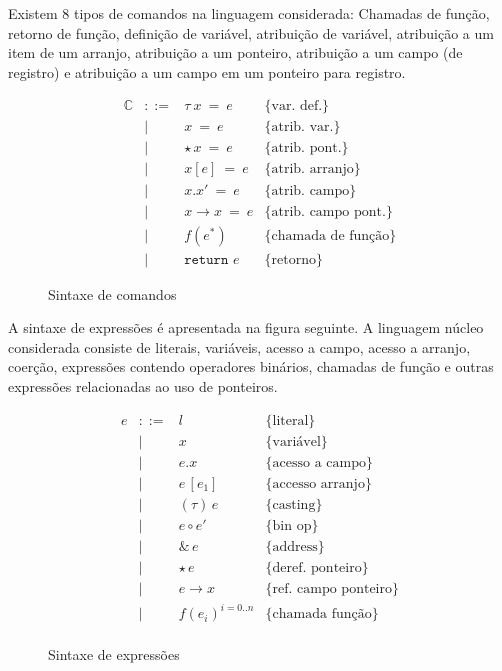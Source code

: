 \documentclass[a4paper,8pt]{article}
\begin{document}
     Existem 8 tipos de comandos na linguagem considerada: Chamadas de
     função, retorno de função, definição de variável, atribuição de
     variável, atribuição a um item de um arranjo, atribuição a um
     ponteiro, atribuição a um campo (de registro) e atribuição a um
     campo em um ponteiro para registro.

     \begin{figure}[h]
       \[
         \begin{array}{lcll}
           \mathbb{C} & ::=   & \tau\:x\:=\:e & \{\text{var. def.}\} \\
             & \mid & x\:=\:e & \{\text{atrib. var.}\} \\
             & \mid & \star\,x\:=\:e & \{\text{atrib. pont.}\} \\
             & \mid & x[e]\:=\:e &\{\text{atrib. arranjo}\} \\
             & \mid & x.x'\: = \: e & \{\text{atrib. campo}\} \\
             & \mid & x\to x\: = \: e & \{\text{atrib. campo pont.}\}\\
             & \mid & f(e^*) & \{\text{chamada de função}\} \\
             & \mid & \texttt{return }e & \{\text{retorno}\}
         \end{array} \]
       \centering
       \caption{Sintaxe de comandos}
       \label{figcmdsyn}
    \end{figure}

    A sintaxe de expressões é apresentada na figura seguinte. A
    linguagem núcleo considerada consiste de literais, variáveis,
    acesso a campo, acesso a arranjo, coerção, expressões contendo
    operadores binários, chamadas de função e outras expressões
    relacionadas ao uso de ponteiros.

    \begin{figure}[h]
       \[
         \begin{array}{lcll}
           e & ::= & l & \{\text{literal}\} \\
             & \mid & x & \{\text{variável}\} \\
             & \mid & e . x & \{\text{acesso a campo}\}\\
             & \mid & e\,[e_1] & \{\text{accesso arranjo}\} \\
             & \mid & (\tau)\,e & \{\text{casting}\} \\
             &\mid & e\circ e' & \{\text{bin op}\} \\
             & \mid & \&\,e & \{\text{address}\} \\
             & \mid & \star\,e & \{\text{deref. ponteiro}\}\\
             & \mid & e \to x & \{\text{ref. campo ponteiro}\}\\
             & \mid & f(e_i)^{i=0..n} & \{\text{chamada função}\}\\
         \end{array} \]
         \centering
         \caption{Sintaxe de expressões}
         \label{exprsyn}
    \end{figure}
\end{document}
